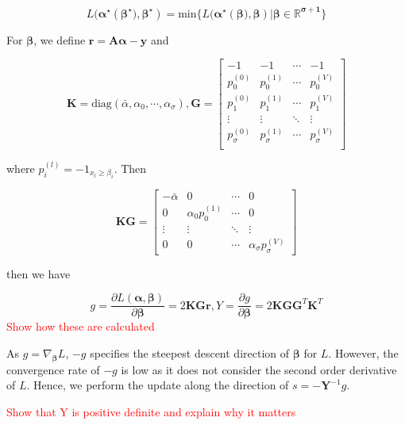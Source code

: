 \begin{equation}
	L(\boldsymbol{\alpha^\star}(\boldsymbol{\beta^\star)}, \boldsymbol{\beta^\star})=\text{min}\{L(\boldsymbol{\alpha^\star}(\boldsymbol{\beta)}, \boldsymbol{\beta}) | \boldsymbol{\beta\in\mathbb{R}^{\sigma+1}}\}
\end{equation}

For $\boldsymbol{\beta}$, we define $\boldsymbol{r}=\boldsymbol{A\alpha-y}$ and 

$$
\boldsymbol{K}=\text{diag}(\bar{\alpha},\alpha_0, \cdots, \alpha_\sigma), \boldsymbol{G}=\begin{bmatrix}
 -1 & -1 & \cdots & -1 \\
  p_0^{(0)} & p_0^{(1)} & \cdots & p_0^{(V)} \\
  p_1^{(0)} & p_1^{(1)} & \cdots & p_1^{(V)} \\
  \vdots & \vdots & \ddots & \vdots \\
  p_\sigma^{(0)} & p_\sigma^{(1)}& \cdots & p_\sigma^{(V)} \\
\end{bmatrix}
$$

where $p_i^{(l)}=-1_{x_l\geq \beta_i}$. Then

$$
\boldsymbol{KG}=\begin{bmatrix}
 -\bar{\alpha} & 0 & \cdots & 0 \\
 0 & \alpha_0p_0^{(1)} & \cdots  & 0 \\
 \vdots & \vdots & \ddots & \vdots \\
 0 & 0 & \cdots & \alpha_\sigma p_\sigma^{(V)}
\end{bmatrix}
$$

then we have 

\begin{equation}
	g=\frac{\partial L(\boldsymbol{\alpha},\boldsymbol{\beta})}{\partial \boldsymbol{\beta}}=2\boldsymbol{KGr},
	Y=\frac{\partial g}{\partial \boldsymbol{\beta}}=2\boldsymbol{KGG}^T \boldsymbol{K}^T
\end{equation}
\textcolor{red}{Show how these are calculated}

As $g=\nabla_{\boldsymbol{\beta}} L$, $-g$ specifies the steepest descent direction of $\boldsymbol{\beta}$ for $L$. However, the convergence rate of $-g$ is low as it does not consider the second order derivative of $L$. Hence, we perform the update along the direction of $s=-\boldsymbol{Y}^{-1}g$.

\textcolor{red}{Show that Y is positive definite and explain why it matters}  

